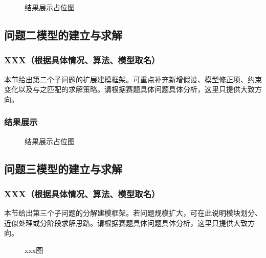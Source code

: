 \documentclass[12pt,a4paper]{article}
\begin{document}
\begin{figure}[H]
    \centering
    \caption{结果展示占位图}
    \label{fig:result}
\end{figure}

\subsection{问题二模型的建立与求解}


\subsubsection{XXX（根据具体情况、算法、模型取名）}
本节给出第二个子问题的扩展建模框架。可重点补充新增假设、模型修正项、约束变化以及与之匹配的求解策略。请根据赛题具体问题具体分析，这里只提供大致方向。

\subsubsection{结果展示}

\begin{figure}[H]
    \centering
    \caption{结果展示占位图}
    \label{fig:result}
\end{figure}

\subsection{问题三模型的建立与求解}

\subsubsection{XXX（根据具体情况、算法、模型取名）}
本节给出第三个子问题的分解建模框架。若问题规模扩大，可在此说明模块划分、近似处理或分阶段求解思路。请根据赛题具体问题具体分析，这里只提供大致方向。

\begin{figure}[H]
    \centering
    \caption{xxx图}
    \label{fig:result}
\end{figure}
\end{document}

